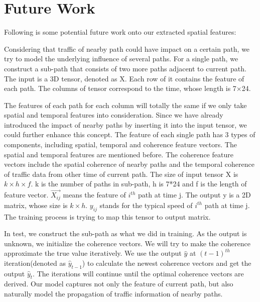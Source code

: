 \section{Future Work}
Following is some potential future work onto our extracted spatial features:

Considering that traffic of nearby path could have impact on a certain path, we try to model the underlying influence of several paths. 
For a single path, we construct a sub-path that consists of two more paths adjacent to current path. 
The input is a 3D tensor, denoted as X. Each row of it contains the feature of each path. 
The columns of tensor correspond to the time, whose length is 7$\times$24.

The features of each path for each column will totally the same if we only take spatial and temporal features into consideration. Since we have already introduced the impact of nearby paths by inserting it into the input tensor, we could further enhance this concept. 
The feature of each single path has 3 types of components, including spatial, temporal and coherence feature vectors. The spatial and temporal features are mentioned before. 
The coherence feature vectors include the spatial coherence of nearby paths and the temporal coherence of traffic data from other time of current path.
The size of input tensor X is $k \times h \times f$. k is the number of paths in sub-path, h is 7*24 and f is the length of feature vector. $\vec{X_{ij}} $ means the feature of $i^{th}$ path at time j.
The output y is a 2D matrix, whose size is $k \times h$. $y_{ij} $ stands for the typical speed of $i^{th}$ path at time j.
The training process is trying to map this tensor to output matrix.

In test, we construct the sub-path as what we did in training. As the output is unknown, we initialize the coherence vectors.
We will try to make the coherence approximate the true value iteratively.
We use the output $\hat{y}$ at ${(t-1)}^{th}$ iteration(denoted as $\hat{y}_{t-1}$) to calculate the newest coherence vectors and get the output $\hat{y}_t$. The iterations will continue until the optimal coherence vectors are derived.
Our model captures not only the feature of current path, but also naturally model the propagation of traffic information of nearby paths.